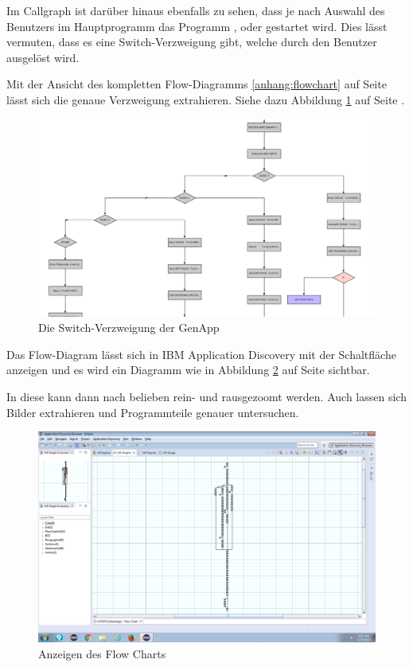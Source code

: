 Im Callgraph ist darüber hinaus ebenfalls zu sehen, dass je nach Auswahl des Benutzers im Hauptprogramm das Programm
,  oder  gestartet wird. Dies lässt vermuten, dass es eine Switch-Verzweigung
gibt, welche durch den Benutzer ausgelöst wird.

Mit der Ansicht des kompletten Flow-Diagramms \ref{anhang:flowchart} auf Seite \pageref{anhang:flowchart} lässt sich die
genaue Verzweigung extrahieren. Siehe dazu Abbildung \ref{fig:ibmad_flowchartSwitch} auf Seite
\pageref{fig:ibmad_flowchartSwitch}.

\begin{figure}[h]
  \centering
    \includegraphics[scale=0.35]{images/kapitel_4/ibmad_flowchartSwitch.pdf}
  \caption{Die Switch-Verzweigung der GenApp}
  \label{fig:ibmad_flowchartSwitch}
\end{figure}

Das Flow-Diagram lässt sich in IBM Application Discovery mit der Schaltfläche  anzeigen und es wird ein
Diagramm wie in Abbildung \ref{fig:ibmad_graph} auf Seite \pageref{fig:ibmad_graph} sichtbar.

In diese kann dann nach belieben rein- und rausgezoomt werden. Auch lassen sich Bilder extrahieren und Programmteile
genauer untersuchen.

\begin{figure}[h]
  \centering
    \includegraphics[scale=0.28]{images/kapitel_4/ibmad_graph.png}
  \caption{Anzeigen des Flow Charts}
  \label{fig:ibmad_graph}
\end{figure}

